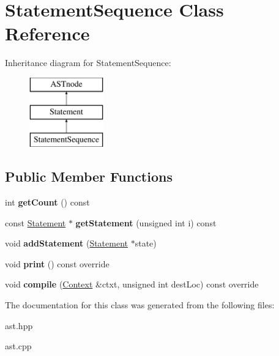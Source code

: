 \hypertarget{class_statement_sequence}{}\section{Statement\+Sequence Class Reference}
\label{class_statement_sequence}
Inheritance diagram for Statement\+Sequence\+:\begin{figure}[H]
\begin{center}
\leavevmode
\includegraphics[height=3.000000cm]{class_statement_sequence}
\end{center}
\end{figure}
\subsection*{Public Member Functions}
\begin{DoxyCompactItemize}
\item 
\mbox{\label{class_statement_sequence_aabfb1f6393ce14ed25da26a9bf4bc0a1}} 
int {\bfseries get\+Count} () const
\item 
\mbox{\label{class_statement_sequence_abc55c98ec4555f7c8c9c3a05c7acd65b}} 
const \hyperlink{class_statement}{Statement} $\ast$ {\bfseries get\+Statement} (unsigned int i) const
\item 
\mbox{\label{class_statement_sequence_a226f128693fd1ac1209dd3b4c0a36c5d}} 
void {\bfseries add\+Statement} (\hyperlink{class_statement}{Statement} $\ast$state)
\item 
\mbox{\label{class_statement_sequence_a26676a17f25d1f746d7246a846c7c484}} 
void {\bfseries print} () const override
\item 
\mbox{\label{class_statement_sequence_a514173eedcad219da4755f9b9185af16}} 
void {\bfseries compile} (\hyperlink{class_context}{Context} \&ctxt, unsigned int dest\+Loc) const override
\end{DoxyCompactItemize}


The documentation for this class was generated from the following files\+:\begin{DoxyCompactItemize}
\item 
ast.\+hpp\item 
ast.\+cpp\end{DoxyCompactItemize}
